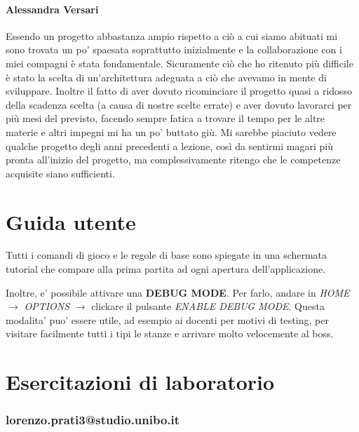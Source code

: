 \documentclass[a4paper,12pt]{report}
\begin{document}
\subsubsection{Alessandra Versari}
Essendo un progetto abbastanza ampio rispetto a ciò a cui siamo abituati mi sono trovata un po' spaesata soprattutto inizialmente e la collaborazione con i miei compagni è stata fondamentale. Sicuramente ciò che ho ritenuto più difficile è stato la scelta di un'architettura adeguata a ciò che avevamo in mente di sviluppare.
Inoltre il fatto di aver dovuto ricominciare il progetto quasi a ridosso della scadenza scelta (a causa di nostre scelte errate) e aver dovuto lavorarci per più mesi del previsto, facendo sempre fatica a trovare il tempo per le altre materie e altri impegni mi ha un po' buttato giù.
Mi sarebbe piaciuto vedere qualche progetto degli anni precedenti a lezione, così da sentirmi magari più pronta all'inizio del progetto, ma complessivamente ritengo che le competenze acquisite siano sufficienti.

\chapter{Guida utente}
Tutti i comandi di gioco e le regole di base sono spiegate in una schermata tutorial che compare alla prima partita ad ogni apertura dell'applicazione.

Inoltre, e' possibile attivare una \textbf{DEBUG MODE}. Per farlo, andare in \textit{HOME} $\rightarrow$ \textit{OPTIONS} $\rightarrow$ clickare il pulsante \textit{ENABLE DEBUG MODE}. Questa modalita' puo' essere utile, ad esempio ai docenti per motivi di testing, per visitare facilmente tutti i tipi le stanze e arrivare molto velocemente al boss.

\chapter{Esercitazioni di laboratorio}

\subsection{lorenzo.prati3@studio.unibo.it}
\end{document}
